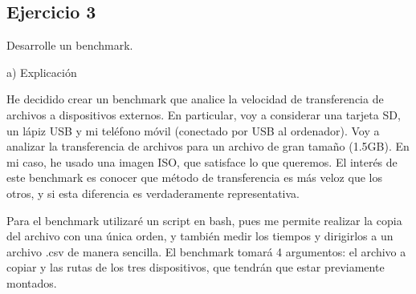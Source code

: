 \documentclass[a4paper, 11pt]{article} %
\begin{document}
\subsection{Ejercicio 3}
Desarrolle un benchmark. 

a) Explicación

He decidido crear un benchmark que analice la velocidad de transferencia de archivos a dispositivos externos. En particular, voy a considerar una tarjeta SD, un lápiz USB y mi teléfono móvil (conectado por USB al ordenador). Voy a analizar la transferencia de archivos para un archivo de gran tamaño (1.5GB). En mi caso, he usado una imagen ISO, que satisface lo que queremos. El interés de este benchmark es conocer que método de transferencia es más veloz que los otros, y si esta diferencia es verdaderamente representativa. 

Para el benchmark utilizaré un script en bash, pues me permite realizar la copia del archivo con una única orden, y también medir los tiempos y dirigirlos a un archivo .csv de manera sencilla. El benchmark tomará 4 argumentos: el archivo a copiar y las rutas de los tres dispositivos, que tendrán que estar previamente montados.
\end{document}

